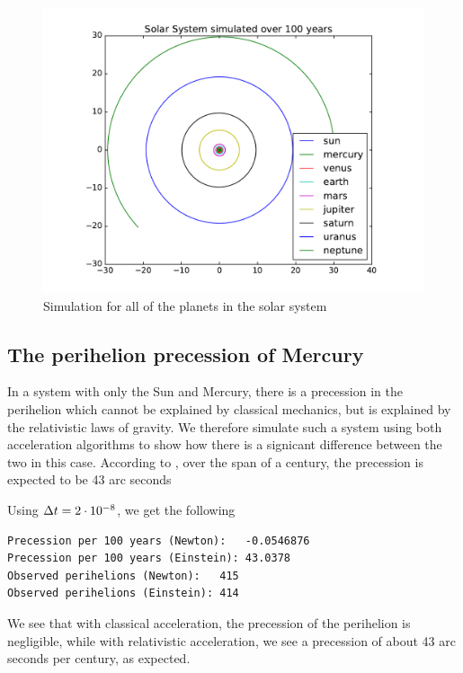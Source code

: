 \documentclass[a4paper]{article}
\begin{document}
\begin{figure}[htb]
\includegraphics[width=\textwidth]{fig/solar_system.pdf}
\caption{Simulation for all of the planets in the solar system}
\label{fig:solar_system}
\end{figure}


\subsection{The perihelion precession of Mercury}
In a system with only the Sun and Mercury, there is a precession in the perihelion which cannot be explained by classical mechanics, but is explained by the relativistic laws of gravity. We therefore simulate such a system using both acceleration algorithms to show how there is a signicant difference between the two in this case. According to \cite{fys3150_project3}, over the span of a century, the precession is expected to be 43 arc seconds

Using ${\Delta t}=2 \cdot 10^{-8}$, we get the following

\begin{lstlisting}[basicstyle=\footnotesize, frame=single, label={lst:precession},caption=Perihelion precession of Mercury]
Precession per 100 years (Newton):   -0.0546876
Precession per 100 years (Einstein): 43.0378
Observed perihelions (Newton):   415
Observed perihelions (Einstein): 414
\end{lstlisting}

We see that with classical acceleration, the precession of the perihelion is negligible, while with relativistic acceleration, we see a precession of about 43 arc seconds per century, as expected.
\end{document}
